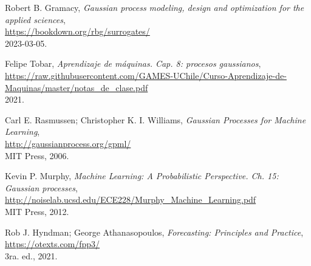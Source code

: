 \documentclass[a4paper]{article}
\begin{document}
\begin{thebibliography}{9}
	
	Robert B. Gramacy, \textit{Gaussian process modeling, design and optimization for the applied sciences},\\
	\url{https://bookdown.org/rbg/surrogates/}\\
	2023-03-05.
	
	Felipe Tobar, \textit{Aprendizaje de máquinas. Cap. 8: procesos gaussianos},\\
	\url{https://raw.githubusercontent.com/GAMES-UChile/Curso-Aprendizaje-de-Maquinas/master/notas_de_clase.pdf}\\
	2021.
	
	Carl E. Rasmussen; Christopher K. I. Williams, \textit{Gaussian Processes for Machine Learning},\\
	\url{http://gaussianprocess.org/gpml/}\\
	MIT Press, 2006.
	
	Kevin P. Murphy, \textit{Machine Learning: A Probabilistic Perspective. Ch. 15: Gaussian processes},\\
	\url{http://noiselab.ucsd.edu/ECE228/Murphy_Machine_Learning.pdf}\\
	MIT Press, 2012.
	
	Rob J. Hyndman; George Athanasopoulos, \textit{Forecasting: Principles and Practice},\\
	\url{https://otexts.com/fpp3/}\\
	3ra. ed., 2021.
	
\end{thebibliography}
\end{document}
